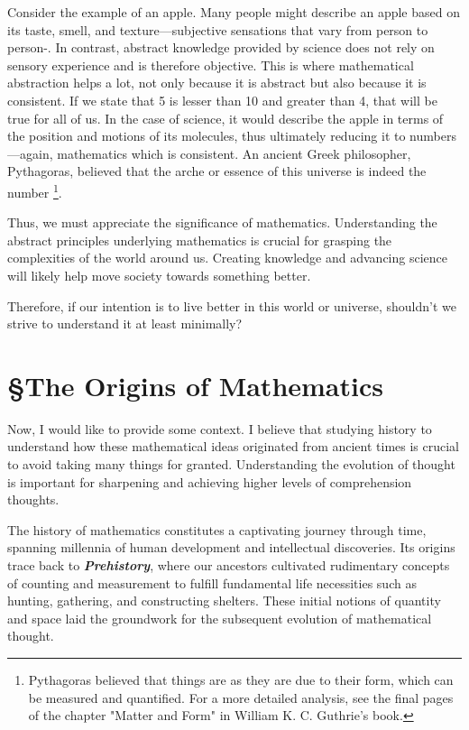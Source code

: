 Consider the example of an apple. Many people might describe an apple based on its taste, smell, and texture—subjective sensations that vary from person to person-. In contrast, abstract knowledge provided by science does not rely on sensory experience and is therefore objective. This is where mathematical abstraction helps a lot, not only because it is abstract but also because it is consistent. If we state that 5 is lesser than 10 and greater than 4, that will be true for all of us. In the case of science, it would describe the apple in terms of the position and motions of its molecules, thus ultimately reducing it to numbers—again, mathematics which is consistent. An ancient Greek philosopher, Pythagoras, believed that the arche or essence of this universe is indeed the number
\footnote{Pythagoras believed that things are as they are due to their form, which can be measured and quantified. For a more detailed analysis, see the final pages of the chapter "Matter and Form" in William K. C. Guthrie's book.}.

Thus, we must appreciate the significance of mathematics. Understanding the abstract principles underlying mathematics is crucial for grasping the complexities of the world around us. Creating knowledge and advancing science will likely help move society towards something better.

Therefore, if our intention is to live better in this world or universe, shouldn’t we strive to understand it at least minimally?

\section{\S The Origins of  Mathematics}
Now, I would like to provide some context. I believe that studying history to understand how these mathematical ideas originated from ancient times is crucial to avoid taking many things for granted. Understanding the evolution of thought is important for sharpening and achieving higher levels of comprehension thoughts.

The history of mathematics constitutes a captivating journey through time, spanning millennia of human development and intellectual discoveries. Its origins trace back to \textbf{\textit{Prehistory}}, where our ancestors cultivated rudimentary concepts of counting and measurement to fulfill fundamental life necessities such as hunting, gathering, and constructing shelters. These initial notions of quantity and space laid the groundwork for the subsequent evolution of mathematical thought.

